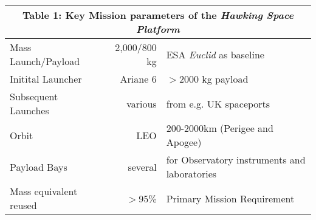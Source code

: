 \documentclass[a4paper,12pt]{article}
\begin{document}
  \begin{table}
\begin{center}
  \begin{tabular}{lrl}
    \multicolumn{3}{c}{Table 1: Key Mission parameters of the \textit{Hawking Space Platform}} \\
    \midrule 
    Mass Launch/Payload	             & 2,000/800 kg & ESA \textit{Euclid} as baseline \\
    Initital Launcher                &	Ariane 6 & $>$2000 kg payload \\
    Subsequent Launches     &  various & from e.g. UK spaceports \\
    Orbit & LEO & 200-2000km (Perigee and Apogee) \\
    Payload Bays  & several & for Observatory instruments and laboratories \\
    Mass equivalent reused & $>$95\% & Primary Mission Requirement \\
    \bottomrule
  \end{tabular}
  \end{center}
  \end{table}
  \vspace{-18pt}
  
\end{document}
